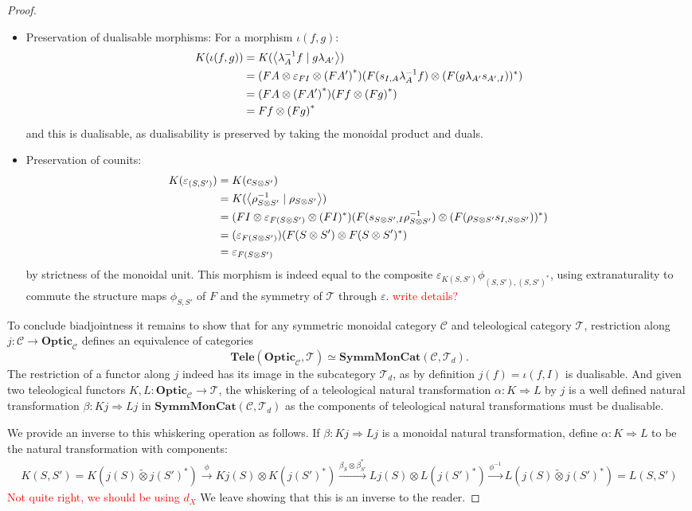\documentclass[11pt,letterpaper]{article}
\theoremstyle{plain}
\theoremstyle{definition}
\newcommand{\C}{\mathscr{C}}
\newcommand{\T}{\mathscr{T}}
\newcommand{\SymmMonCat}{\mathbf{SymmMonCat}}
\newcommand{\Tele}{\mathbf{Tele}}
\newcommand{\Optic}{\mathbf{Optic}}
\newcommand{\switched}{\mathbin{\tilde{\otimes}}}
\newcommand{\rep}[2]{{\ensuremath \left\langle #1 \mid #2 \right\rangle}}
\newcommand{\todo}[1]{\textcolor{red}{\small #1}}
\begin{document}
\begin{proof}
\begin{itemize}
\item Preservation of dualisable morphisms:  For a morphism $\iota(f, g)$:
\begin{align*}
K(\iota(f, g))
    &= K(\rep{\lambda_A^{-1} f}{g \lambda_{A'}}) \\
    &= (FA \otimes \varepsilon_{FI} \otimes {(FA')}^*)(F(s_{I,A}\lambda_A^{-1} f) \otimes (F(g \lambda_{A'}s_{A', I}))^* ) \\
    &= (FA \otimes {(FA')}^*)(Ff \otimes {(Fg)}^* ) \\
    &= Ff \otimes {(Fg)}^*
\end{align*}
and this is dualisable, as dualisability is preserved by taking the monoidal product and duals.
\item Preservation of counits:
\begin{align*}
K(\varepsilon_{(S, S')})
&= K(c_{S \otimes S'}) \\
&= K(\rep{\rho_{S \otimes S'}^{-1}}{\rho_{S \otimes S'}}) \\
&= (FI \otimes \varepsilon_{F(S \otimes S')} \otimes (FI)^*)(F(s_{S \otimes S',I}\rho_{S \otimes S'}^{-1}) \otimes (F(\rho_{S \otimes S'} s_{I, S \otimes S'}))^* ) \\
&= (\varepsilon_{F(S \otimes S')})(F(S \otimes S') \otimes F(S \otimes S')^* ) \\
&= \varepsilon_{F(S \otimes S')}
\end{align*}
by strictness of the monoidal unit. This morphism is indeed equal to the composite $\varepsilon_{K(S, S')} \phi_{(S, S'), {(S, S')}^*}$, using extranaturality to commute the structure maps $\phi_{S, S'}$ of $F$ and the symmetry of $\T$ through $\varepsilon$. \todo{write details?}
\end{itemize}

To conclude biadjointness it remains to show that for any symmetric monoidal category $\C$ and teleological category $\T$, restriction along $j : \C \to \Optic_\C$ defines an equivalence of categories \[\Tele(\Optic_\C, \T) \simeq \SymmMonCat(\C, \T_d). \]
The restriction of a functor along $j$ indeed has its image in the subcategory $\T_d$, as by definition $j(f) = \iota(f, I)$ is dualisable. And given two teleological functors $K, L : \Optic_\C \to \T$, the whiskering of a teleological natural transformation $\alpha : K \Rightarrow L$ by $j$ is a well defined natural transformation $\beta : K j \Rightarrow L j$ in $\SymmMonCat(\C, \T_d)$ as the components of teleological natural transformations must be dualisable.

We provide an inverse to this whiskering operation as follows. If $\beta : K j \Rightarrow L j$ is a monoidal natural transformation, define $\alpha : K \Rightarrow L$ to be the natural transformation with components:
\begin{align*}
K(S, S') = K(j(S) \switched {j(S')}^*) \xrightarrow{\phi} Kj(S) \otimes K({j(S')}^*) \xrightarrow{\beta_S \otimes \beta_{S'}^*} Lj(S) \otimes L({j(S')}^*) \xrightarrow{\phi^{-1}} L(j(S) \switched {j(S')}^*) = L(S, S')
\end{align*}
\todo{Not quite right, we should be using $d_X$} We leave showing that this is an inverse to the reader.
\end{proof}
\end{document}

